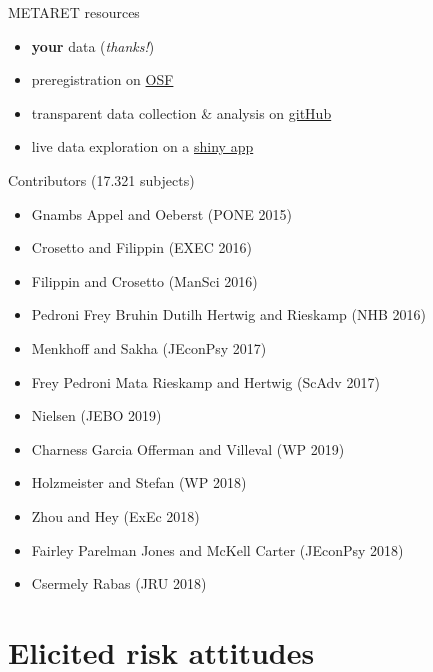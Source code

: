 \documentclass[
  ignorenonframetext,
]{beamer}
\providecommand{\tightlist}{%
  \setlength{\itemsep}{0pt}\setlength{\parskip}{0pt}}
\begin{document}
\begin{frame}{METARET resources}
\protect\hypertarget{metaret-resources}{}

\begin{itemize}
\item
  \textbf{your} data (\emph{thanks!})
\item
  preregistration on \href{https://osf.io/h2z56/}{OSF}
\item
  transparent data collection \& analysis on
  \href{https://github.com/paolocrosetto/METARET}{gitHub}
\item
  live data exploration on a
  \href{https://paolocrosetto.shinyapps.io/METARET/}{shiny app}
\end{itemize}

\end{frame}

\begin{frame}{Contributors (17.321 subjects)}
\protect\hypertarget{contributors-17.321-subjects}{}

\begin{itemize}
\tightlist
\item
  Gnambs Appel and Oeberst (PONE 2015)
\item
  Crosetto and Filippin (EXEC 2016)
\item
  Filippin and Crosetto (ManSci 2016)
\item
  Pedroni Frey Bruhin Dutilh Hertwig and Rieskamp (NHB 2016)
\item
  Menkhoff and Sakha (JEconPsy 2017)
\item
  Frey Pedroni Mata Rieskamp and Hertwig (ScAdv 2017)
\item
  Nielsen (JEBO 2019)
\item
  Charness Garcia Offerman and Villeval (WP 2019)
\item
  Holzmeister and Stefan (WP 2018)
\item
  Zhou and Hey (ExEc 2018)
\item
  Fairley Parelman Jones and McKell Carter (JEconPsy 2018)
\item
  Csermely Rabas (JRU 2018)
\end{itemize}

\end{frame}

\hypertarget{elicited-risk-attitudes}{%
\section{Elicited risk attitudes}\label{elicited-risk-attitudes}}
\end{document}
